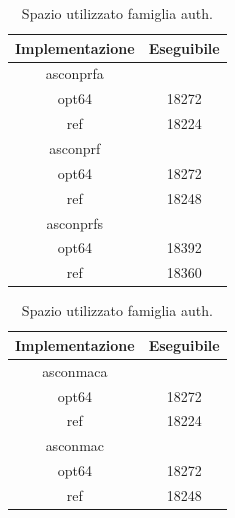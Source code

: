 \documentclass[12pt,a4paper,italian]{report}
\begin{document}
\begin{table}[h]
    \caption{Spazio utilizzato famiglia auth.}
    \begin{minipage}[t]{0.5\linewidth}
        \centering
        \begin{tabular}{|c|c|}
            \hline
            Implementazione & Eseguibile \\
            \hline
            asconprfa & \\
            \hline
            opt64 & 18272 \\
            \hline
            ref & 18224 \\
            \hline
            asconprf & \\
            \hline
            opt64 & 18272 \\
            \hline
            ref & 18248 \\
            \hline
            asconprfs & \\
            \hline
            opt64 & 18392 \\
            \hline
            ref & 18360 \\
            \hline
        \end{tabular}
    \end{minipage}
    \begin{minipage}[t]{0.5\linewidth}
        \centering
        \begin{tabular}{|c|c|}
            \hline
            Implementazione & Eseguibile \\
            \hline
            asconmaca & \\
            \hline
            opt64 & 18272 \\
            \hline
            ref & 18224 \\
            \hline
            asconmac & \\
            \hline
            opt64 & 18272 \\
            \hline
            ref & 18248 \\
            \hline
        \end{tabular}
    \end{minipage}
\end{table}
\end{document}
